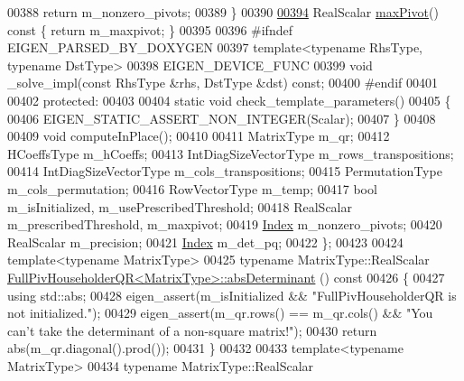 \begin{DoxyCode}
00388       \textcolor{keywordflow}{return} m\_nonzero\_pivots;
00389     \}
00390 
\hyperlink{group___q_r___module_a7887506237a3bf912aebc9aaa8edacec}{00394}     RealScalar \hyperlink{group___q_r___module_a7887506237a3bf912aebc9aaa8edacec}{maxPivot}()\textcolor{keyword}{ const }\{ \textcolor{keywordflow}{return} m\_maxpivot; \}
00395     
00396 \textcolor{preprocessor}{    #ifndef EIGEN\_PARSED\_BY\_DOXYGEN}
00397     \textcolor{keyword}{template}<\textcolor{keyword}{typename} RhsType, \textcolor{keyword}{typename} DstType>
00398     EIGEN\_DEVICE\_FUNC
00399     \textcolor{keywordtype}{void} \_solve\_impl(\textcolor{keyword}{const} RhsType &rhs, DstType &dst) \textcolor{keyword}{const};
00400 \textcolor{preprocessor}{    #endif}
00401 
00402   \textcolor{keyword}{protected}:
00403     
00404     \textcolor{keyword}{static} \textcolor{keywordtype}{void} check\_template\_parameters()
00405     \{
00406       EIGEN\_STATIC\_ASSERT\_NON\_INTEGER(Scalar);
00407     \}
00408     
00409     \textcolor{keywordtype}{void} computeInPlace();
00410     
00411     MatrixType m\_qr;
00412     HCoeffsType m\_hCoeffs;
00413     IntDiagSizeVectorType m\_rows\_transpositions;
00414     IntDiagSizeVectorType m\_cols\_transpositions;
00415     PermutationType m\_cols\_permutation;
00416     RowVectorType m\_temp;
00417     \textcolor{keywordtype}{bool} m\_isInitialized, m\_usePrescribedThreshold;
00418     RealScalar m\_prescribedThreshold, m\_maxpivot;
00419     \hyperlink{namespace_eigen_a62e77e0933482dafde8fe197d9a2cfde}{Index} m\_nonzero\_pivots;
00420     RealScalar m\_precision;
00421     \hyperlink{namespace_eigen_a62e77e0933482dafde8fe197d9a2cfde}{Index} m\_det\_pq;
00422 \};
00423 
00424 \textcolor{keyword}{template}<\textcolor{keyword}{typename} MatrixType>
00425 \textcolor{keyword}{typename} MatrixType::RealScalar \hyperlink{group___q_r___module_a1029e1ccc70bb8669043c5775e7f3b75}{FullPivHouseholderQR<MatrixType>::absDeterminant}
      ()\textcolor{keyword}{ const}
00426 \textcolor{keyword}{}\{
00427   \textcolor{keyword}{using} std::abs;
00428   eigen\_assert(m\_isInitialized && \textcolor{stringliteral}{"FullPivHouseholderQR is not initialized."});
00429   eigen\_assert(m\_qr.rows() == m\_qr.cols() && \textcolor{stringliteral}{"You can't take the determinant of a non-square matrix!"});
00430   \textcolor{keywordflow}{return} abs(m\_qr.diagonal().prod());
00431 \}
00432 
00433 \textcolor{keyword}{template}<\textcolor{keyword}{typename} MatrixType>
00434 \textcolor{keyword}{typename} MatrixType::RealScalar 

\end{DoxyCode}
